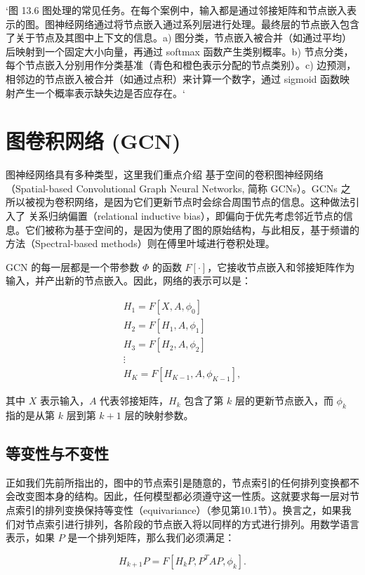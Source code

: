 `图 13.6 图处理的常见任务。在每个案例中，输入都是通过邻接矩阵和节点嵌入表示的图。图神经网络通过将节点嵌入通过系列层进行处理。最终层的节点嵌入包含了关于节点及其图中上下文的信息。a) 图分类，节点嵌入被合并（如通过平均）后映射到一个固定大小向量，再通过 softmax 函数产生类别概率。b) 节点分类，每个节点嵌入分别用作分类基准（青色和橙色表示分配的节点类别）。c) 边预测，相邻边的节点嵌入被合并（如通过点积）来计算一个数字，通过 sigmoid 函数映射产生一个概率表示缺失边是否应存在。`

\section{图卷积网络 (GCN)}
图神经网络具有多种类型，这里我们重点介绍 基于空间的卷积图神经网络（Spatial-based Convolutional Graph Neural Networks, 简称 GCNs）。GCNs 之所以被视为卷积网络，是因为它们更新节点时会综合周围节点的信息。这种做法引入了 关系归纳偏置（relational inductive bias），即偏向于优先考虑邻近节点的信息。它们被称为基于空间的，是因为使用了图的原始结构，与此相反，基于频谱的方法（Spectral-based methods）则在傅里叶域进行卷积处理。

GCN 的每一层都是一个带参数 \(\Phi\) 的函数 \(F[\cdot]\)，它接收节点嵌入和邻接矩阵作为输入，并产出新的节点嵌入。因此，网络的表示可以是：


\begin{align}
H_1 = F[X, A, \phi_0] \\
H_2 = F[H_1, A, \phi_1] \\
H_3 = F[H_2, A, \phi_2] \\
\vdots \\
H_K = F[H_{K-1}, A, \phi_{K-1}], 
\end{align} 


其中 \(X\) 表示输入，\(A\) 代表邻接矩阵，\(H_k\) 包含了第 \(k\) 层的更新节点嵌入，而 \(\phi_k\) 指的是从第 \(k\) 层到第 \(k+1\) 层的映射参数。

\subsection{等变性与不变性}
正如我们先前所指出的，图中的节点索引是随意的，节点索引的任何排列变换都不会改变图本身的结构。因此，任何模型都必须遵守这一性质。这就要求每一层对节点索引的排列变换保持等变性（equivariance）（参见第10.1节）。换言之，如果我们对节点索引进行排列，各阶段的节点嵌入将以同样的方式进行排列。用数学语言表示，如果 \(P\) 是一个排列矩阵，那么我们必须满足：

\begin{equation}
H_{k+1}P = F[H_kP, P^TAP, \phi_k]. 
\end{equation}

